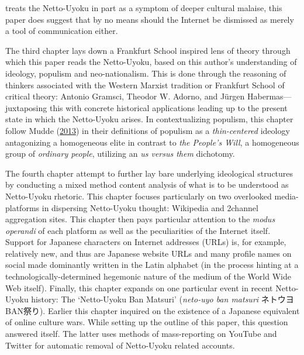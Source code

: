 \documentclass[10pt,british,A4paper,twoside]{memoir}
\begin{document}
treats the Netto-Uyoku in part as a symptom of deeper cultural malaise,
this paper does suggest that by no means should the Internet be
dismissed as merely a tool of communication either.

The third chapter lays down a Frankfurt School inspired lens of theory
through which this paper reads the Netto-Uyoku, based on this author's
understanding of ideology, populism and neo-nationalism. This is done
through the reasoning of thinkers associated with the Western Marxist
tradition or Frankfurt School of critical theory: Antonio Gramsci,
Theodor W. Adorno, and Jürgen Habermas---juxtaposing this with concrete
historical applications leading up to the present state in which the
Netto-Uyoku arises. In contextualizing populism, this chapter follow
Mudde (\protect\hyperlink{ref-mudde_oxford_2013}{2013}) in their
definitions of populism as a \emph{thin-centered} ideology antagonizing
a homogeneous elite in contrast to \emph{the People's Will}, a
homogeneous group of \emph{ordinary people}, utilizing an \emph{us
versus them} dichotomy.

The fourth chapter attempt to further lay bare underlying ideological
structures by conducting a mixed method content analysis of what is to
be understood as Netto-Uyoku rhetoric. This chapter focuses particularly
on two overlooked media-platforms in dispersing Netto-Uyoku thought:
Wikipedia and 2channel aggregation sites. This chapter then pays
particular attention to the \emph{modus operandi} of each platform as
well as the peculiarities of the Internet itself. Support for Japanese
characters on Internet addresses (URLs) is, for example, relatively new,
and thus are Japanese website URLs and many profile names on social made
dominantly written in the Latin alphabet (in the process hinting at a
technologically-determined hegemonic nature of the medium of the World
Wide Web itself). Finally, this chapter expands on one particular event
in recent Netto-Uyoku history: The `Netto-Uyoku Ban Matsuri'
(\emph{neto-uyo ban matsuri} ネトウヨBAN祭り). Earlier this chapter
inquired on the existence of a Japanese equivalent of online culture
wars. While setting up the outline of this paper, this question answered
itself. The latter uses methods of mass-reporting on YouTube and Twitter
for automatic removal of Netto-Uyoku related accounts.
\end{document}
